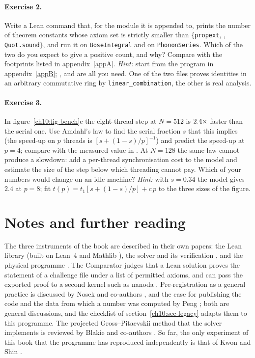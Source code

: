 \paragraph{Exercise 2.} Write a Lean command that, for the module it is appended to, prints the number of theorem constants whose axiom set is strictly
smaller than $\{$\texttt{propext}, , \texttt{Quot.sound}$\}$, and run it on \texttt{BoseIntegral} and on \texttt{PhononSeries}. Which of
the two do you expect to give a positive count, and why? Compare with the footprints listed in appendix~\ref{appA}. \emph{Hint:} start from the program in
appendix~\ref{appB}; ,  and  are all you need. One of the two files proves identities in
an arbitrary commutative ring by \texttt{linear\_combination}, the other is real analysis.

\paragraph{Exercise 3.} In figure~\ref{ch10:fig-bench}c the eight-thread step at $N=512$ is $2.4\times$ faster than the serial one.
Use Amdahl's law to find the serial fraction $s$ that this implies (the speed-up on $p$ threads is $[s+(1-s)/p]^{-1}$) and predict the speed-up at $p=4$;
compare with the measured value in . At $N=128$ the same law cannot produce a slowdown: add a per-thread
synchronisation cost to the model and estimate the size of the step below which threading cannot pay. Which of your numbers would change on an idle
machine? \emph{Hint:} with $s=0.34$ the model gives $2.4$ at $p=8$; fit $t(p)=t_1[s+(1-s)/p]+c\,p$ to the three sizes of the figure.

\section*{Notes and further reading}

The three instruments of the book are described in their own papers: the Lean library \cite{Callens2026lib} (built on Lean~4 \cite{deMoura2021} and
Mathlib \cite{Mathlib2020}), the solver and its verification \cite{Callens2026sw}, and the physical programme \cite{Callens2026a,Callens2026b}. The
Comparator \cite{LeanComparator} judges that a Lean solution proves the statement of a challenge file under a list of permitted axioms, and can pass
the exported proof to a second kernel such as nanoda \cite{Nanoda}. Pre-registration as a general practice is discussed by Nosek and
co-authors \cite{Nosek2018}, and the case for publishing the code and the data from which a number was computed by Peng \cite{Peng2011}; both are
general discussions, and the checklist of section~\ref{ch10:sec-legacy} adapts them to this programme. The projected Gross--Pitaevskii method
that the solver implements is reviewed by Blakie and co-authors \cite{Blakie2008}. So far, the only experiment of this book that the programme has reproduced
independently is that of Kwon and Shin \cite{KwonShin2026prr}.
